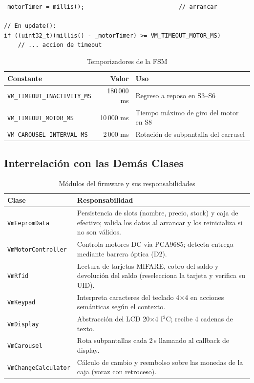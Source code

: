 \documentclass[12pt,a4paper]{article}
\begin{document}
\begin{lstlisting}[style=cpp, caption={Patrón de temporizador no bloqueante}]
_motorTimer = millis();                           // arrancar

// En update():
if ((uint32_t)(millis() - _motorTimer) >= VM_TIMEOUT_MOTOR_MS)
    // ... accion de timeout
\end{lstlisting}

\begin{table}[H]
\centering
\begin{tabular}{lrp{5.5cm}}
\toprule
\textbf{Constante} & \textbf{Valor} & \textbf{Uso} \\
\midrule
\texttt{VM\_TIMEOUT\_INACTIVITY\_MS} & 180\,000 ms & Regreso a reposo en S3–S6 \\
\texttt{VM\_TIMEOUT\_MOTOR\_MS}      &  10\,000 ms & Tiempo máximo de giro del motor en S8 \\
\texttt{VM\_CAROUSEL\_INTERVAL\_MS}  &   2\,000 ms & Rotación de subpantalla del carrusel \\
\bottomrule
\end{tabular}
\caption{Temporizadores de la FSM}
\end{table}

\subsection{Interrelación con las Demás Clases}

\begin{table}[H]
\centering
\renewcommand{\arraystretch}{1.3}
\begin{tabular}{lp{9cm}}
\toprule
\textbf{Clase} & \textbf{Responsabilidad} \\
\midrule
\texttt{VmEepromData}      & Persistencia de slots (nombre, precio, stock) y caja de efectivo; valida los datos al arrancar y los reinicializa si no son v\'alidos. \\
\texttt{VmMotorController} & Controla motores DC vía PCA9685; detecta entrega mediante barrera óptica (D2). \\
\texttt{VmRfid}            & Lectura de tarjetas MIFARE, cobro del saldo y devoluci\'on del saldo (reselecciona la tarjeta y verifica su UID). \\
\texttt{VmKeypad}          & Interpreta caracteres del teclado 4×4 en acciones semánticas según el contexto. \\
\texttt{VmDisplay}         & Abstracción del LCD 20×4 I$^2$C; recibe 4 cadenas de texto. \\
\texttt{VmCarousel}        & Rota subpantallas cada 2\,s llamando al callback de display. \\
\texttt{VmChangeCalculator}& Cálculo de cambio y reembolso sobre las monedas de la caja (voraz con retroceso). \\
\bottomrule
\end{tabular}
\caption{Módulos del firmware y sus responsabilidades}
\end{table}
\end{document}
